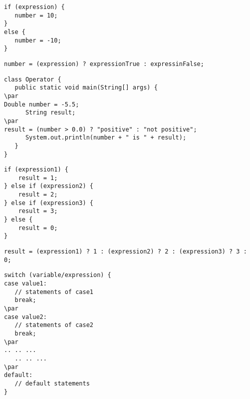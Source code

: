 \documentclass{book}
\def\lthtmlcheckvsize{\ifdim\ht\sizebox<\vsize 
  \ifdim\wd\sizebox<\hsize\expandafter\hfill\fi \expandafter\vfill
  \else\expandafter\vss\fi}%
\begin{document}
{\newpage\clearpage
{}%
\begin{lstlisting}
if (expression) {
   number = 10;
}
else {
   number = -10;
}
\end{lstlisting}%
\lthtmlfigureZ
\lthtmlcheckvsize\clearpage}

{\newpage\clearpage
{}%
\begin{lstlisting}
number = (expression) ? expressionTrue : expressinFalse;
\end{lstlisting}%
\lthtmlfigureZ
\lthtmlcheckvsize\clearpage}

{\newpage\clearpage
{}%
\begin{lstlisting}
class Operator {
   public static void main(String[] args) {   
\par
Double number = -5.5;
      String result;
\par
result = (number > 0.0) ? "positive" : "not positive";
      System.out.println(number + " is " + result);
   }
}
\end{lstlisting}%
\lthtmlfigureZ
\lthtmlcheckvsize\clearpage}

{\newpage\clearpage
{}%
\begin{lstlisting}
if (expression1) {
	result = 1;
} else if (expression2) {
	result = 2;
} else if (expression3) {
	result = 3;
} else {
	result = 0;
}
\end{lstlisting}%
\lthtmlfigureZ
\lthtmlcheckvsize\clearpage}

{\newpage\clearpage
{}%
\begin{lstlisting}
result = (expression1) ? 1 : (expression2) ? 2 : (expression3) ? 3 : 0;
\end{lstlisting}%
\lthtmlfigureZ
\lthtmlcheckvsize\clearpage}

{\newpage\clearpage
{}%
\begin{lstlisting}
switch (variable/expression) {
case value1:
   // statements of case1
   break;
\par
case value2:
   // statements of case2
   break;
\par
.. .. ...
   .. .. ...
\par
default:
   // default statements
}
\end{lstlisting}%
\lthtmlfigureZ
\lthtmlcheckvsize\clearpage}
\end{document}
